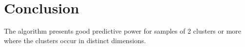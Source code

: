 \documentclass[12pt]{article}
\begin{document}
%
\section{Conclusion}

The algorithm presents good predictive power for samples of 2 clusters or more where the clusters occur in distinct dimensions.
\end{document}
